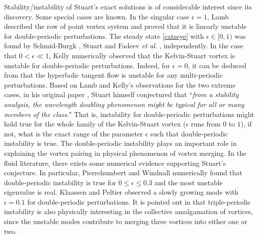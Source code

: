 \documentclass[1 [leqno, 11pt]{amsart}
\numberwithin{equation}{section}
\let\ep=\epsilon
\begin{document}
\begin{CJK*}{GBK}{song}
Stability/instability of Stuart's exact solutions  is of considerable interest since its discovery.
Some special cases are known.
 In the singular case  $\epsilon = 1$,
 Lamb \cite{lamb1932hydrodynamics}
 described the row of point vortex system  and proved that it is linearly  unstable  for double-periodic perturbations.
 The  steady state \eqref{catseye} with $\ep \in [0, 1)$ was found by   Schmid-Burgk \cite{Schmid-Burgk1965},  Stuart \cite{stuart1967finite} and Fadeev  {\it et al.} \cite{Fadeev et al-1965},  independently.
 \fi
In the case that  $0<\epsilon \ll 1$,  Kelly \cite{kelly1967stability} numerically observed  that the Kelvin-Stuart vortex is unstable for double-periodic perturbations.
Indeed, for $\ep=0$,  it can be deduced from  \cite{lin2003instability} that
the hyperbolic tangent  flow
 is   unstable for any multi-periodic perturbations.
 Based on Lamb and Kelly's observations for the two extreme cases, in his original paper \cite{stuart1967finite}, Stuart himself conjectured that ``{\it from a stability analysis, the wavelength doubling phenomenon might be
typical for all or many members of the class.}" That is, instability  for double-periodic perturbations might hold true for the whole family of the  Kelvin-Stuart vortex ($\ep$ runs from $0$ to $1$), if not, what is the exact  range of the  parameter $\ep$ such that double-periodic instability is true.
 The  double-periodic instability plays an important role in explaining the vortex pairing in physical phenomenon of  vortex merging.
 In the fluid literature, there exists some numerical evidence supporting Stuart's conjecture. In particular,
Pierrehumbert and Windnall \cite{pierrehumbert1982two} numerically found that double-periodic instability is true for $0\leq \ep\leq 0.3$ and the most unstable eigenvalue is real. Klaassen and Peltier \cite{Klaassen-Peltier1987} observed a slowly growing mode with $\ep= 0.1$ for double-periodic perturbations. It is  pointed out in \cite{Klaassen-Peltier1989} that  triple-periodic instability is also   physically interesting  in the collective amalgamation of vortices, since the unstable modes contribute to  merging   three vortices into  either one or two.



\end{CJK*}
\end{document}
